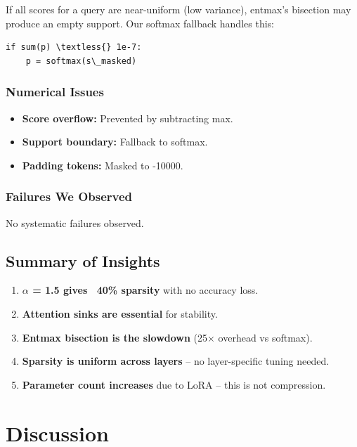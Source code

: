 If all scores for a query are near-uniform (low variance), entmax's bisection 
may produce an empty support. Our softmax fallback handles this:

\begin{lstlisting}
if sum(p) \textless{} 1e-7:
    p = softmax(s\_masked)
\end{lstlisting}

\subsubsection{Numerical Issues}

\begin{itemize}
\item \textbf{Score overflow:} Prevented by subtracting max.
\item \textbf{Support boundary:} Fallback to softmax.
\item \textbf{Padding tokens:} Masked to -10000.

\end{itemize}
\subsubsection{Failures We Observed}

No systematic failures observed.

\subsection{Summary of Insights}

\begin{enumerate}
\item \textbf{$\alpha$ = 1.5 gives ~40\% sparsity} with no accuracy loss.
\item \textbf{Attention sinks are essential} for stability.
\item \textbf{Entmax bisection is the slowdown} (25$\times$ overhead vs softmax).
\item \textbf{Sparsity is uniform across layers} -- no layer-specific tuning needed.
\item \textbf{Parameter count increases} due to LoRA -- this is not compression.
\end{enumerate}


\section{Discussion}

